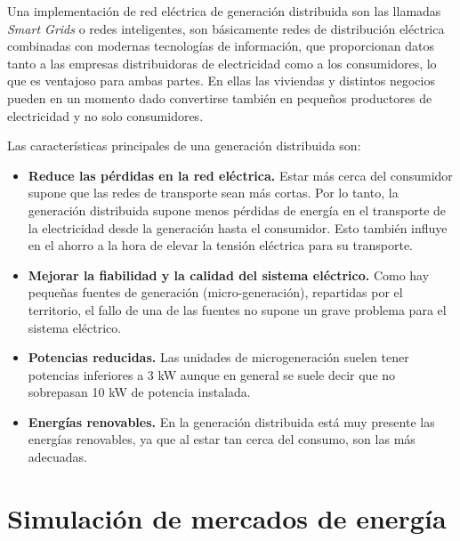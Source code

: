 Una implementación de red eléctrica de generación distribuida son las llamadas \textit{Smart Grids} o redes inteligentes, son básicamente redes de distribución eléctrica combinadas con modernas tecnologías de información, que proporcionan datos tanto a las empresas distribuidoras de electricidad como a los consumidores, lo que es ventajoso para ambas partes. En ellas las viviendas y distintos negocios pueden en un momento dado convertirse también en pequeños productores de electricidad y no solo consumidores.

Las características principales de una generación distribuida son:

\begin{itemize}
	\item \textbf{Reduce las pérdidas en la red eléctrica.} Estar más cerca del consumidor supone que las redes de transporte sean más cortas. Por lo tanto, la generación distribuida supone menos pérdidas de energía en el transporte de la electricidad desde la generación hasta el consumidor. Esto también influye en el ahorro a la hora de elevar la tensión eléctrica para su transporte.
	
	\item \textbf{Mejorar la fiabilidad y la calidad del sistema eléctrico.} Como hay pequeñas fuentes de generación (micro-generación), repartidas por el territorio, el fallo de una de las fuentes no supone un grave problema para el sistema eléctrico.
	
	\item \textbf{Potencias reducidas.} Las unidades de microgeneración suelen tener potencias inferiores a 3 kW aunque en general se suele decir que no sobrepasan 10 kW de potencia instalada.
	
	\item \textbf{Energías renovables.} En la generación distribuida está muy presente las energías renovables, ya que al estar tan cerca del consumo, son las más adecuadas.
\end{itemize}

\section{Simulación de mercados de energía}

